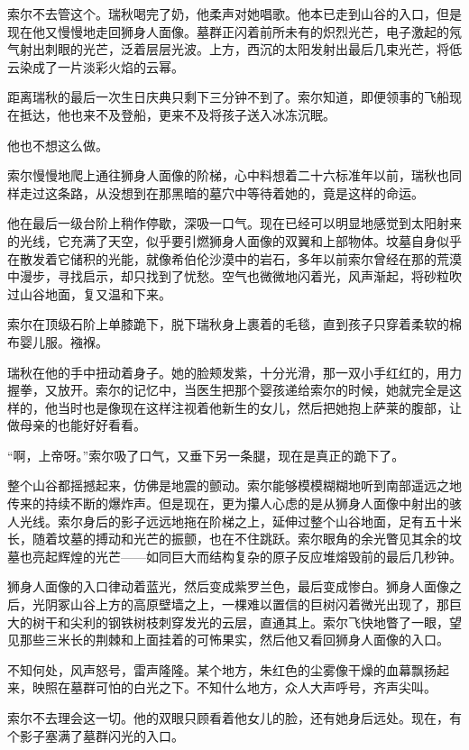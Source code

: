 \documentclass[AutoFakeBold=true]{book}
\begin{document}
索尔不去管这个。瑞秋喝完了奶，他柔声对她唱歌。他本已走到山谷的入口，但是现在他又慢慢地走回狮身人面像。墓群正闪着前所未有的炽烈光芒，电子激起的氖气射出刺眼的光芒，泛着层层光波。上方，西沉的太阳发射出最后几束光芒，将低云染成了一片淡彩火焰的云幂。

距离瑞秋的最后一次生日庆典只剩下三分钟不到了。索尔知道，即便领事的飞船现在抵达，他也来不及登船，更来不及将孩子送入冰冻沉眠。

他也不想这么做。

索尔慢慢地爬上通往狮身人面像的阶梯，心中料想着二十六标准年以前，瑞秋也同样走过这条路，从没想到在那黑暗的墓穴中等待着她的，竟是这样的命运。

他在最后一级台阶上稍作停歇，深吸一口气。现在已经可以明显地感觉到太阳射来的光线，它充满了天空，似乎要引燃狮身人面像的双翼和上部物体。坟墓自身似乎在散发着它储积的光能，就像希伯伦沙漠中的岩石，多年以前索尔曾经在那的荒漠中漫步，寻找启示，却只找到了忧愁。空气也微微地闪着光，风声渐起，将砂粒吹过山谷地面，复又温和下来。

索尔在顶级石阶上单膝跪下，脱下瑞秋身上裹着的毛毯，直到孩子只穿着柔软的棉布婴儿服。襁褓。

瑞秋在他的手中扭动着身子。她的脸颊发紫，十分光滑，那一双小手红红的，用力握拳，又放开。索尔的记忆中，当医生把那个婴孩递给索尔的时候，她就完全是这样的，他当时也是像现在这样注视着他新生的女儿，然后把她抱上萨莱的腹部，让做母亲的也能好好看看。

``啊，上帝呀。''索尔吸了口气，又垂下另一条腿，现在是真正的跪下了。

整个山谷都摇撼起来，仿佛是地震的颤动。索尔能够模模糊糊地听到南部遥远之地传来的持续不断的爆炸声。但是现在，更为攥人心虑的是从狮身人面像中射出的骇人光线。索尔身后的影子远远地拖在阶梯之上，延伸过整个山谷地面，足有五十米长，随着坟墓的搏动和光芒的振颤，也在不住跳跃。索尔眼角的余光瞥见其余的坟墓也亮起辉煌的光芒——如同巨大而结构复杂的原子反应堆熔毁前的最后几秒钟。

狮身人面像的入口律动着蓝光，然后变成紫罗兰色，最后变成惨白。狮身人面像之后，光阴冢山谷上方的高原壁墙之上，一棵难以置信的巨树闪着微光出现了，那巨大的树干和尖利的钢铁树枝刺穿发光的云层，直通其上。索尔飞快地瞥了一眼，望见那些三米长的荆棘和上面挂着的可怖果实，然后他又看回狮身人面像的入口。

不知何处，风声怒号，雷声隆隆。某个地方，朱红色的尘雾像干燥的血幕飘扬起来，映照在墓群可怕的白光之下。不知什么地方，众人大声呼号，齐声尖叫。

索尔不去理会这一切。他的双眼只顾看着他女儿的脸，还有她身后远处。现在，有个影子塞满了墓群闪光的入口。
\end{document}
